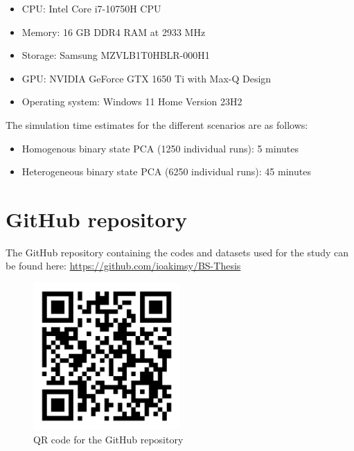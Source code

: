 \begin{itemize}
    \item CPU: Intel Core i7-10750H CPU
    \item Memory: 16 GB DDR4 RAM at 2933 MHz
    \item Storage: Samsung MZVLB1T0HBLR-000H1
    \item GPU: NVIDIA GeForce GTX 1650 Ti with Max-Q Design
    \item Operating system: Windows 11 Home Version 23H2
\end{itemize}

The simulation time estimates for the different scenarios are as follows:
\begin{itemize}
    \item Homogenous binary state PCA (1250 individual runs): 5 minutes
    \item Heterogeneous binary state PCA (6250 individual runs): 45 minutes
\end{itemize}

\section{GitHub repository}
The GitHub repository containing the codes and datasets used for the study can be found here: \url{https://github.com/ioakimsy/BS-Thesis}

\begin{figure}[h!]
    \centering
    \includegraphics[width=0.5\textwidth]{figures/qr-code.png}
    \caption{QR code for the GitHub repository}
    \label{fig:qr-code}
\end{figure}


